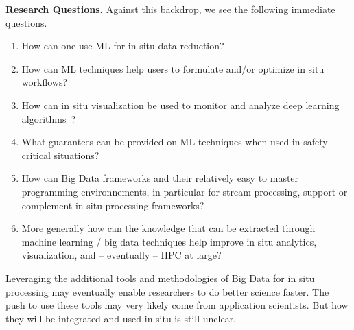 \medskip\noindent
\textbf{\sffamily Research Questions.} 
Against this backdrop, we see the following immediate questions.
\begin{enumerate}
    \item How can one use ML for in situ data reduction?
    \item How can ML techniques help users to formulate and/or optimize in situ workflows? 
    \item How can in situ visualization be used to monitor and analyze deep learning algorithms~\cite{SG16}?
    \item What guarantees can be provided on ML techniques when used in safety critical situations?
    \item How can Big Data frameworks and their relatively easy to master programming environnements, in particular for stream processing, support or complement in situ processing frameworks?
    \item More generally how can the knowledge that can be extracted through  machine learning / big data techniques help improve in situ analytics, visualization, and -- eventually -- HPC at large? 
\end{enumerate}
      
Leveraging the additional tools and methodologies of  Big Data for in situ processing  may eventually enable researchers to do better science faster.  
The push to use these tools may very likely come from application scientists.
But how they will be integrated and used in situ is still unclear. 

